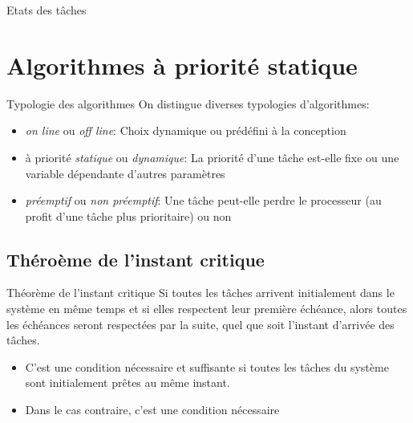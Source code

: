 \begin{frame}{Etats des tâches}
  \begin{center}
    
  \end{center}
\end{frame} 


\section{Algorithmes à priorité statique}

\begin{frame}{Typologie des algorithmes}
  On distingue diverses typologies d'algorithmes:
  \begin{itemize}
  \item  \emph{on  line}  ou   \emph{off  line}:  Choix  dynamique  ou
    prédéfini à la conception
  \item  à priorité \emph{statique}  ou \emph{dynamique}:  La priorité
    d'une  tâche est-elle  fixe  ou une  variable dépendante  d'autres
    paramètres 
  \item \emph{préemptif} ou  \emph{non préemptif}: Une tâche peut-elle
    perdre le  processeur (au profit d'une tâche  plus prioritaire) ou
    non
  \end{itemize}
\end{frame}

\subsection{Théroème de l'instant critique}

\begin{frame}{Théorème de l'instant critique}
  Si toutes les  tâches arrivent initialement dans le  système en même
  temps et  si elles respectent  leur première échéance,  alors toutes
  les  échéances  seront  respectées  par  la  suite,  quel  que  soit
  l'instant d'arrivée des tâches.

  \begin{itemize}
  \item  C'est une condition  nécessaire et  suffisante si  toutes les
    tâches du système sont initialement prêtes au même instant.
  \item Dans le cas contraire, c'est une condition nécessaire
  \end{itemize}

\end{frame}

